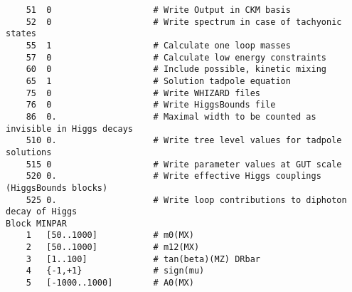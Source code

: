 \documentclass[final,3p,11pt,pdflatex]{elsarticle}
\begin{document}
\begin{lstlisting}
    51  0                    # Write Output in CKM basis
    52  0                    # Write spectrum in case of tachyonic states
    55  1                    # Calculate one loop masses
    57  0                    # Calculate low energy constraints
    60  0                    # Include possible, kinetic mixing
    65  1                    # Solution tadpole equation
    75  0                    # Write WHIZARD files
    76  0                    # Write HiggsBounds file
    86  0.                   # Maximal width to be counted as invisible in Higgs decays
    510 0.                   # Write tree level values for tadpole solutions
    515 0                    # Write parameter values at GUT scale
    520 0.                   # Write effective Higgs couplings (HiggsBounds blocks)
    525 0.                   # Write loop contributions to diphoton decay of Higgs
Block MINPAR
    1   [50..1000]           # m0(MX)
    2   [50..1000]           # m12(MX)
    3   [1..100]             # tan(beta)(MZ) DRbar
    4   {-1,+1}              # sign(mu)
    5   [-1000..1000]        # A0(MX)
\end{lstlisting}

\clearpage
\end{document}

